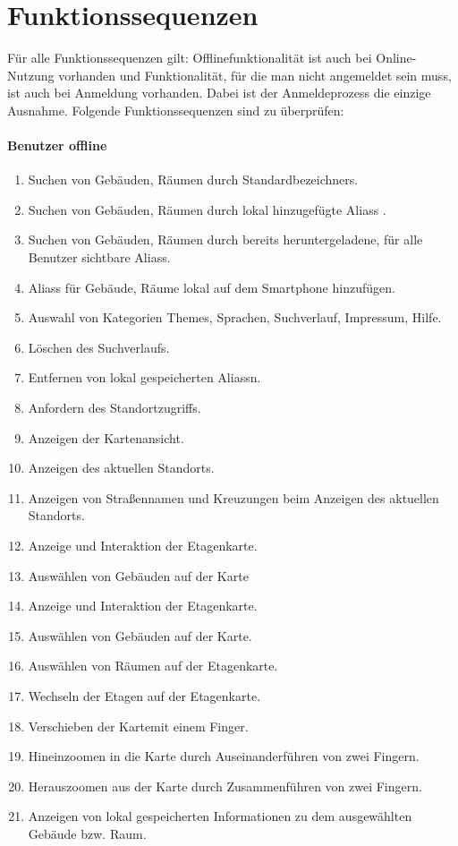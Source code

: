 \section{Funktionssequenzen}

Für alle Funktionssequenzen gilt:
Offlinefunktionalität ist auch bei Online-Nutzung vorhanden und Funktionalität, für die man nicht angemeldet sein muss, ist auch bei Anmeldung vorhanden. Dabei ist der Anmeldeprozess die einzige Ausnahme.
Folgende Funktionssequenzen sind zu überprüfen:

\paragraph{\Gls{Benutzer} offline}
\begin{enumerate}[label=\textbf{/T\arabic*0/}, align=left]
	\item Suchen von Gebäuden, Räumen durch \Glspl{Standardbezeichner}.
	\item Suchen von Gebäuden, Räumen durch \gls{lokal} hinzugefügte \Glspl{Alias} .
	\item Suchen von Gebäuden, Räumen durch bereits heruntergeladene, für alle Benutzer sichtbare \Glspl{Alias}.
	\item \Glspl{Alias} für Gebäude, Räume \gls{lokal} auf dem Smartphone hinzufügen.
	\item Auswahl von Kategorien \Glspl{Theme}, Sprachen, Suchverlauf, Impressum, Hilfe.
	\item Löschen des Suchverlaufs.
	\item Entfernen von \gls{lokal} gespeicherten \Glspl{Alias}n.
	\item Anfordern des Standortzugriffs.
	\item Anzeigen der \Gls{Kartenansicht}.
	\item Anzeigen des aktuellen Standorts.
	\item Anzeigen von Straßennamen und Kreuzungen beim Anzeigen des aktuellen Standorts.
	\item Anzeige und Interaktion der \Gls{Etagenkarte}.
	\item Auswählen von Gebäuden auf der \Gls{Karte}
	\item Anzeige und Interaktion der \Gls{Etagenkarte}.
	\item Auswählen von Gebäuden auf der \Gls{Karte}.
	\item Auswählen von Räumen auf der \Gls{Etagenkarte}.
	\item Wechseln der Etagen auf der \Gls{Etagenkarte}.
	\item Verschieben der \Gls{Karte}mit einem Finger.
	\item Hineinzoomen in die \Gls{Karte} durch Auseinanderführen von zwei Fingern.
	\item Herauszoomen aus der \Gls{Karte} durch Zusammenführen von zwei Fingern.
	\item Anzeigen von \gls{lokal} gespeicherten Informationen zu dem ausgewählten Gebäude bzw. Raum.
\end{enumerate}

